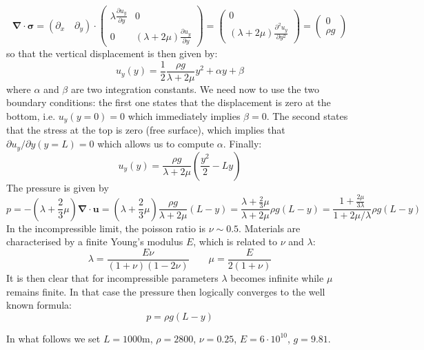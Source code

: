 \[
{\bm \nabla}\cdot {\bm \sigma} =
(\partial_x \quad \partial_y)\cdot 
\left(
\begin{array}{cc}
\lambda \frac{\partial u_y}{\partial y} &  0 \\
0 & (\lambda + 2 \mu) \frac{\partial u_y}{\partial y}
\end{array}
\right)
=
\left(
\begin{array}{c}
0 \\
(\lambda + 2 \mu) \frac{\partial^2 u_y}{\partial y^2}
\end{array}
\right)
=
\left(
\begin{array}{c}
0 \\
\rho g
\end{array}
\right)
\]
so that the vertical displacement is then given by:
\[
u_y(y) = \frac{1}{2} \frac{\rho g}{\lambda + 2 \mu} y^2 + \alpha y + \beta 
\] 
where $\alpha$ and $\beta$ are two integration constants.
We need now to use the two boundary conditions: the first one states that the displacement
is zero at the bottom, i.e. $u_y(y=0)=0$ which immediately implies $\beta=0$.
The second states that the stress at the top is zero (free surface), which implies that 
$\partial u_y/\partial y (y=L)=0$ which allows us to compute $\alpha$.
Finally:
\[
u_y(y) = \frac{\rho g}{\lambda + 2 \mu} (\frac{y^2}{2}-L y) 
\] 
The pressure is given by
\[
p=-(\lambda + \frac{2}{3} \mu) {\bm \nabla}\cdot{\bm u}
= (\lambda + \frac{2}{3} \mu)  \frac{\rho g}{\lambda + 2 \mu} (L -y)
= \frac{\lambda + \frac{2}{3} \mu}{\lambda + 2 \mu} \rho g (L-y)  
= \frac{1 + \frac{2 \mu}{3 \lambda} }{1 + 2 \mu/\lambda} \rho g (L-y)  
\]
In the incompressible limit, the poisson ratio is $\nu \sim 0.5$. 
Materials are characterised by a finite Young's modulus $E$, which is related to 
$\nu$ and $\lambda$:
\[
\lambda=\frac{E \nu}{(1+\nu)(1-2\nu)}
\quad\quad
\mu=\frac{E}{2(1+\nu)}
\]
It is then clear that for incompressible parameters $\lambda$ becomes 
infinite while $\mu$ remains finite. In that case the pressure 
then logically converges to the well known formula:
\[
p=\rho g (L-y)
\]

\newpage
In what follows we set $L=1000$m, $\rho=2800$, $\nu=0.25$, $E=6\cdot10^{10}$, $g=9.81$.

